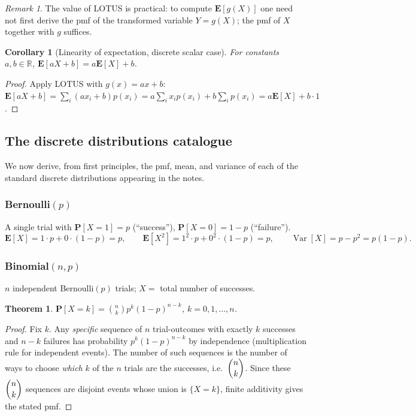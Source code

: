 \documentclass[11pt]{article}
\theoremstyle{definition}
\theoremstyle{plain}
\newtheorem{theorem}[definition]{Theorem}
\newtheorem{corollary}[definition]{Corollary}
\theoremstyle{remark}
\newtheorem{remark}[definition]{Remark}
\newcommand{\E}[1]{\mathbf{E}\!\left[#1\right]}
\newcommand{\Var}[1]{\operatorname{Var}\!\left[#1\right]}
\newcommand{\R}{\mathbb{R}}
\begin{document}
\begin{remark}
The value of LOTUS is practical: to compute $\E{g(X)}$ one need not first derive the pmf of the
transformed variable $Y=g(X)$; the pmf of $X$ together with $g$ suffices.
\end{remark}

\begin{corollary}[Linearity of expectation, discrete scalar case]
For constants $a,b\in\R$, $\E{aX+b} = a\E{X}+b$.
\end{corollary}
\begin{proof}
Apply LOTUS with $g(x)=ax+b$: $\E{aX+b} = \sum_i (ax_i+b)p(x_i) = a\sum_i x_i p(x_i) + b\sum_i p(x_i)
= a\E{X}+b\cdot 1$.
\end{proof}

\subsection{The discrete distributions catalogue}

We now derive, from first principles, the pmf, mean, and variance of each of the standard discrete
distributions appearing in the notes.

\subsubsection{Bernoulli$(p)$}

A single trial with $\mathbf{P}[X=1]=p$ (``success''), $\mathbf{P}[X=0]=1-p$ (``failure'').
\[
\E{X} = 1\cdot p + 0\cdot(1-p) = p, \qquad
\E{X^2} = 1^2\cdot p+0^2\cdot(1-p) = p,\qquad
\Var{X} = p-p^2 = p(1-p).
\]

\subsubsection{Binomial$(n,p)$}

$n$ independent Bernoulli$(p)$ trials; $X=$ total number of successes.

\begin{theorem}
$\displaystyle \mathbf{P}[X=k] = \binom{n}{k}p^k(1-p)^{n-k}$, $k=0,1,\dots,n$.
\end{theorem}
\begin{proof}
Fix $k$. Any \emph{specific} sequence of $n$ trial-outcomes with exactly $k$ successes and $n-k$
failures has probability $p^k(1-p)^{n-k}$ by independence (multiplication rule for independent
events). The number of such sequences is the number of ways to choose \emph{which} $k$ of the $n$
trials are the successes, i.e.\ $\dbinom{n}{k}$. Since these $\dbinom{n}{k}$ sequences are disjoint
events whose union is $\{X=k\}$, finite additivity gives the stated pmf.
\end{proof}
\end{document}
